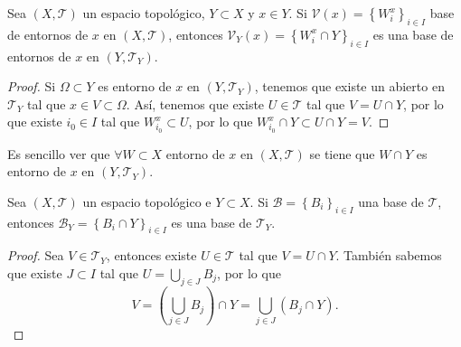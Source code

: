 \begin{prop}
Sea $\displaystyle \left(X, \mathcal{T}\right) $ un espacio topológico, $\displaystyle Y \subset X $ y $\displaystyle x \in Y $. Si $\displaystyle \mathcal{V}\left(x\right)= \left\{ W_{i}^{x}\right\} _{i \in I} $ base de entornos de $\displaystyle x $ en $\displaystyle \left(X, \mathcal{T}\right) $, entonces $\displaystyle \mathcal{V}_{Y}\left(x\right)= \left\{ W^{x}_{i} \cap Y\right\} _{i \in I} $ es una base de entornos de $\displaystyle x $ en $\displaystyle \left(Y, \mathcal{T}_{Y}\right) $. 
\end{prop}
\begin{proof}
Si $\displaystyle \Omega \subset Y $ es entorno de $\displaystyle x $ en $\displaystyle \left(Y, \mathcal{T}_{Y}\right) $, tenemos que existe un abierto en $\displaystyle \mathcal{T}_{Y} $ tal que $\displaystyle x \in V \subset \Omega  $. Así, tenemos que existe $\displaystyle U \in \mathcal{T} $ tal que $\displaystyle V = U \cap Y $, por lo que existe $\displaystyle i_{0} \in I $ tal que $\displaystyle W^{x}_{i_{0}}\subset U $, por lo que $\displaystyle W^{x}_{i_{0}}\cap Y \subset U \cap Y = V $. 
\end{proof}
\begin{observation}
Es sencillo ver que $\displaystyle \forall W \subset X $ entorno de $\displaystyle x $ en $\displaystyle \left(X, \mathcal{T}\right) $ se tiene que $\displaystyle W \cap Y $ es entorno de $\displaystyle x $ en $\displaystyle \left(Y, \mathcal{T}_{Y}\right) $. 
\end{observation}
\begin{prop}
	Sea $\displaystyle \left(X, \mathcal{T}\right) $ un espacio topológico e $\displaystyle Y \subset X $. Si $\displaystyle \mathcal{B}= \left\{ B_{i}\right\} _{i \in I} $ una base de $\displaystyle \mathcal{T} $, entonces $\displaystyle \mathcal{B}_{Y}= \left\{ B_{i} \cap Y\right\} _{i \in I} $ es una base de $\displaystyle \mathcal{T}_{Y} $. 
\end{prop}
\begin{proof}
Sea $\displaystyle V \in \mathcal{T}_{Y} $, entonces existe $\displaystyle U \in \mathcal{T} $ tal que $\displaystyle V = U \cap Y $. También sabemos que existe $\displaystyle J \subset I $ tal que $\displaystyle U = \bigcup_{j \in J}B_{j} $, por lo que 
\[V = \left(\bigcup_{j \in J}B_{j}\right) \cap Y = \bigcup_{j \in J}\left(B_{j} \cap Y\right) .\]
\end{proof}
